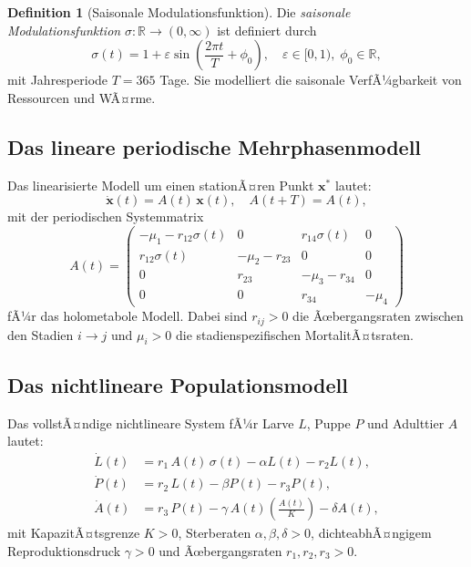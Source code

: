 ﻿\documentclass[12pt, a4paper]{article}
\theoremstyle{definition}
\newtheorem{definition}[theorem]{Definition}
\newcommand{\R}{\mathbb{R}}
\begin{document}
\begin{definition}[Saisonale Modulationsfunktion]\label{def:modulation}
Die \emph{saisonale Modulationsfunktion} $\sigma: \R \to (0, \infty)$ ist definiert
durch
\[
  \sigma(t) = 1 + \varepsilon \sin\!\left(\frac{2\pi t}{T} + \phi_0\right),
  \quad \varepsilon \in [0, 1),\; \phi_0 \in \R,
\]
mit Jahresperiode $T = 365$ Tage. Sie modelliert die saisonale VerfÃ¼gbarkeit von
Ressourcen und WÃ¤rme.
\end{definition}

\subsection{Das lineare periodische Mehrphasenmodell}

Das linearisierte Modell um einen stationÃ¤ren Punkt $\bm{x}^*$ lautet:
\begin{equation}\label{eq:linear-system}
  \dot{\bm{x}}(t) = A(t)\,\bm{x}(t), \quad A(t+T) = A(t),
\end{equation}
mit der periodischen Systemmatrix
\begin{equation}\label{eq:matrix-A}
A(t) = \begin{pmatrix}
  -\mu_1 - r_{12}\sigma(t) & 0 & r_{14}\sigma(t) & 0 \\
  r_{12}\sigma(t) & -\mu_2 - r_{23} & 0 & 0 \\
  0 & r_{23} & -\mu_3 - r_{34} & 0 \\
  0 & 0 & r_{34} & -\mu_4
\end{pmatrix}
\end{equation}
fÃ¼r das holometabole Modell. Dabei sind $r_{ij} > 0$ die Ãœbergangsraten zwischen
den Stadien $i \to j$ und $\mu_i > 0$ die stadienspezifischen MortalitÃ¤tsraten.

\subsection{Das nichtlineare Populationsmodell}

Das vollstÃ¤ndige nichtlineare System fÃ¼r Larve $L$, Puppe $P$ und Adulttier $A$
lautet:
\begin{subequations}\label{eq:nl-system}
\begin{align}
  \dot{L}(t) &= r_1\,A(t)\,\sigma(t) - \alpha L(t) - r_2 L(t), \label{eq:nl-L}\\
  \dot{P}(t) &= r_2\,L(t) - \beta P(t) - r_3 P(t), \label{eq:nl-P}\\
  \dot{A}(t) &= r_3\,P(t) - \gamma\,A(t)\!\left(\frac{A(t)}{K}\right) - \delta A(t), \label{eq:nl-A}
\end{align}
\end{subequations}
mit KapazitÃ¤tsgrenze $K > 0$, Sterberaten $\alpha, \beta, \delta > 0$,
dichteabhÃ¤ngigem Reproduktionsdruck $\gamma > 0$ und Ãœbergangsraten
$r_1, r_2, r_3 > 0$.
\end{document}
